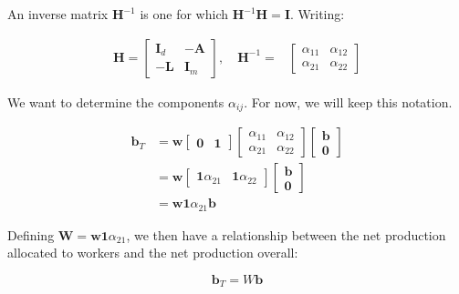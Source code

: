 An inverse matrix $\boldsymbol{H}^{-1}$ is one for which $\boldsymbol{H}^{-1}\boldsymbol{H}=\boldsymbol{I}$. Writing:


\begin{align}
\boldsymbol{H}=\left[\begin{array}{cc}
\boldsymbol{I}_{d} & -\boldsymbol{A}\\
-\boldsymbol{L} & \boldsymbol{I}_{m}
\end{array}\right],\quad\boldsymbol{H}^{-1}= & \left[\begin{array}{cc}
\alpha_{11} & \alpha_{12}\\
\alpha_{21} & \alpha_{22}
\end{array}\right]
\end{align}

We want to determine the components $\alpha_{ij}$. For now, we will keep this notation.


\begin{align}
\boldsymbol{b}_{T} & =\boldsymbol{w}\left[\begin{array}{cc}
\boldsymbol{0} & \boldsymbol{1}\end{array}\right]\left[\begin{array}{cc}
\alpha_{11} & \alpha_{12}\\
\alpha_{21} & \alpha_{22}
\end{array}\right]\left[\begin{array}{c}
\boldsymbol{b}\\
\boldsymbol{0}
\end{array}\right]\\
 & =\boldsymbol{w}\left[\begin{array}{cc}
\boldsymbol{1}\alpha_{21} & \boldsymbol{1}\alpha_{22}\end{array}\right]\left[\begin{array}{c}
\boldsymbol{b}\\
\boldsymbol{0}
\end{array}\right]\\
 & =\boldsymbol{w}\boldsymbol{1}\alpha_{21}\boldsymbol{b}
\end{align}

Defining $\boldsymbol{W}=\boldsymbol{w}\boldsymbol{1}\alpha_{21}$, we then have a relationship between the net production allocated to workers and the net production overall:


\begin{equation}
\boldsymbol{b}_{T}=W\boldsymbol{b}
\end{equation}

